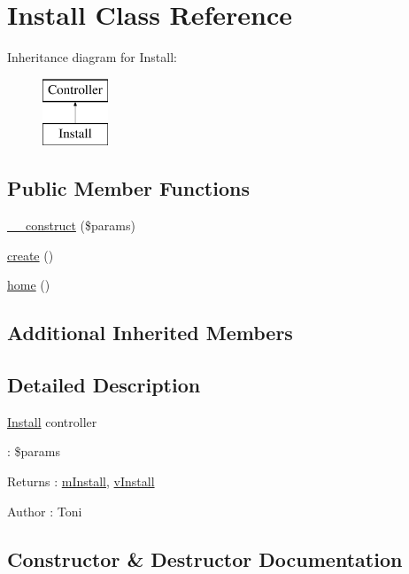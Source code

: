 \hypertarget{classInstall}{}\section{Install Class Reference}
\label{classInstall}
Inheritance diagram for Install\+:\begin{figure}[H]
\begin{center}
\leavevmode
\includegraphics[height=2.000000cm]{classInstall}
\end{center}
\end{figure}
\subsection*{Public Member Functions}
\begin{DoxyCompactItemize}
\item 
\hyperlink{classInstall_a8c56eced2e088518d8277b0311b76c98}{\+\_\+\+\_\+construct} (\$params)
\item 
\hyperlink{classInstall_a57068dd458224588afa484a72bda51b8}{create} ()
\item 
\hyperlink{classInstall_a2814ac3657bb9e1e9ce0eb721fb7b105}{home} ()
\end{DoxyCompactItemize}
\subsection*{Additional Inherited Members}


\subsection{Detailed Description}
\hyperlink{classInstall}{Install} controller

\+: \$params \begin{DoxyReturn}{Returns}
\+: \hyperlink{classmInstall}{m\+Install}, \hyperlink{classvInstall}{v\+Install} 
\end{DoxyReturn}
\begin{DoxyAuthor}{Author}
\+: Toni 
\end{DoxyAuthor}


\subsection{Constructor \& Destructor Documentation}
\hypertarget{classInstall_a8c56eced2e088518d8277b0311b76c98}{}
